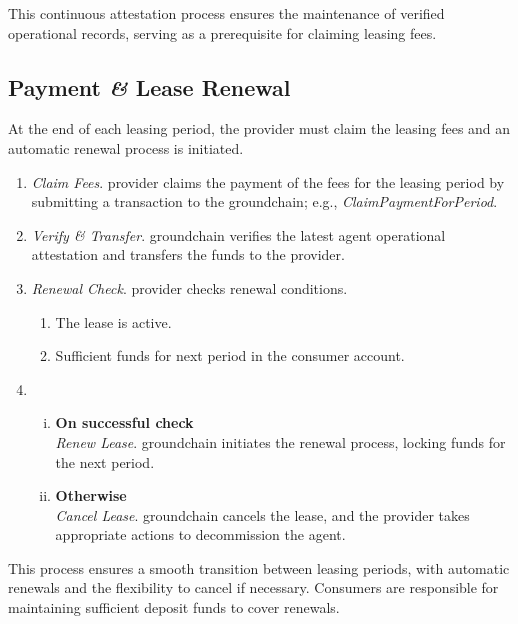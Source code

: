 \documentclass{oc}
\begin{document}
This continuous attestation process ensures the maintenance of verified operational records, serving as a prerequisite for claiming leasing fees.

\subsection{Payment \textit{\&} Lease Renewal}\label{sec:claim-renewal}

At the end of each leasing period, the \gls{provider} must claim the leasing fees and an automatic renewal process is initiated.
\begin{enumerate}
    \item \emph{Claim Fees}. \Gls{provider} claims the payment of the fees for the leasing period by submitting a transaction to the \gls{groundchain}; e.g., \textit{ClaimPaymentForPeriod}.
    \item \emph{Verify \& Transfer}. \Gls{groundchain} verifies the latest \gls{agent} operational attestation and transfers the funds to the \gls{provider}.
    \item \emph{Renewal Check}. \Gls{provider} checks renewal conditions.
      \begin{enumerate}
        \item The lease is active.
        \item Sufficient funds for next period in the \gls{consumer} account.
      \end{enumerate}
    \item
      \begin{enumerate}[(i)]
        \item \textbf{On successful check} \\
          \emph{Renew Lease}. \Gls{groundchain} initiates the renewal process, locking funds for the next period.
        \item \textbf{Otherwise} \\
          \emph{Cancel Lease}. \Gls{groundchain} cancels the lease, and the \gls{provider} takes appropriate actions to decommission the \gls{agent}.
      \end{enumerate}
\end{enumerate}

This process ensures a smooth transition between leasing periods, with automatic renewals and the flexibility to cancel if necessary.
Consumers are responsible for maintaining sufficient deposit funds to cover renewals.

\clearpage

\printglossary


\end{document}
